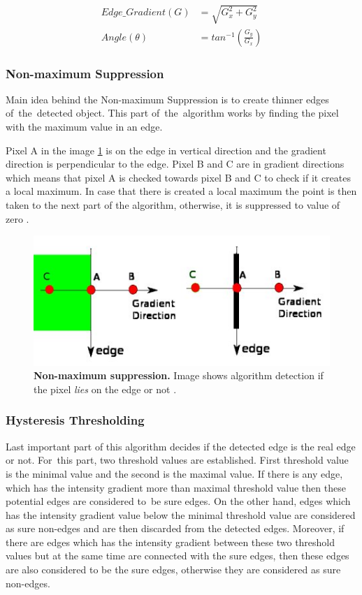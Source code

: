 \begin{align}
\label{eq:gradient1}
    Edge\_Gradient(G) &= \sqrt{G_x^2 + G_y^2}\\
    \label{eq:gradient2}
    Angle(\theta) &= tan^{-1}  \left( \frac{G_y}{G_x} \right)
\end{align}  
\subsubsection{Non-maximum Suppression}

Main idea behind the Non\hyp{}maximum Suppression is to create thinner edges of~the~detected object. This part of~the~algorithm works by finding the pixel with the maximum value in an edge.

Pixel A in the image \ref{nms} is on the edge in vertical direction and the gradient direction is perpendicular to the edge. Pixel B and C are in gradient directions which means that pixel A is checked towards pixel B and C to check if it creates a local maximum. In case that there is created a local maximum the point is then taken to the next part of the algorithm, otherwise, it is suppressed to value of zero \cite{canny-opencv}.

\begin{figure}[!ht]
    \centering
    \includegraphics[width=.6\textwidth]{obrazky-figures/nms}
    \caption{\textbf{Non-maximum suppression.} Image shows algorithm detection if the pixel \textit{lies} on the edge or not \cite{canny-opencv}.}
    \label{nms}
\end{figure}

\subsubsection{Hysteresis Thresholding}
Last important part of this algorithm decides if the detected edge is the real edge or not. For~this part, two threshold values are established. First threshold value is the minimal value and the second is the maximal value. If there is any edge, which has the intensity gradient more than maximal threshold value then these potential edges are considered to~be sure edges. On the other hand, edges which has the intensity gradient value below the minimal threshold value are considered as sure non-edges and are then discarded from the detected edges. Moreover, if there are edges which has the intensity gradient between these two threshold values but at the same time are connected with the sure edges, then these edges are also considered to be the sure edges, otherwise they are considered as sure non-edges.

